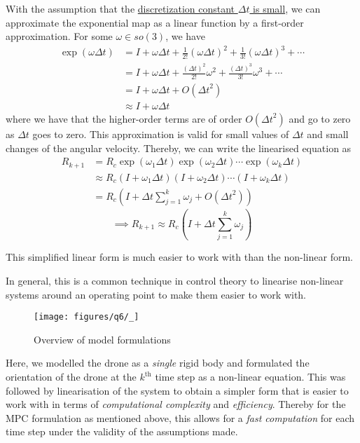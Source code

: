 With the assumption that the \underline{discretization constant \( \Delta t \) is small}, we can approximate the exponential map as a linear function by a first-order approximation.
For some \( \omega \in so(3)\), we have
\begin{align*}
    \exp(\omega \Delta t)
     & =
    I + \omega \Delta t + \frac{1}{2!} {(\omega \Delta t)}^2 + \frac{1}{3!} {(\omega \Delta t)}^3 + \cdots
    \\ & =
    I + \omega \Delta t + \frac{{(\Delta t)}^2}{2!} \omega^2 + \frac{{(\Delta t)}^3}{3!} \omega^3 + \cdots
    \\ & =
    I + \omega \Delta t + O({\Delta t}^2)
    \\
     & \approx
    I + \omega \Delta t
\end{align*}
where we have that the higher-order terms are of order \( O({\Delta t}^2) \) and go to zero as \( \Delta t \) goes to zero.
This approximation is valid for small values of \( \Delta t \) and small changes of the angular velocity.
Thereby, we can write the linearised equation as
\begin{align*}
    R_{k+1}
     & =
    R_c \exp(\omega_1 \Delta t) \exp(\omega_2 \Delta t) \cdots \exp(\omega_k \Delta t)
    \\ & \approx
    R_c (I + \omega_1 \Delta t) (I + \omega_2 \Delta t) \cdots (I + \omega_k \Delta t)
    \\ & =
    R_c \left( I + \Delta t \sum_{j=1}^{k} \omega_j + O({\Delta t}^2) \right)
\end{align*}
\begin{equation*}
    \implies
    \boxed{
        R_{k+1}
        \approx
        R_c \left( I + \Delta t \sum_{j=1}^{k} \omega_j \right)
    }
\end{equation*}

This simplified linear form is much easier to work with than the non-linear form.

In general, this is a common technique in control theory to linearise non-linear systems around an operating point to make them easier to work with.

\begin{figure}[htbp]
    \centering
    \texttt{[image: figures/q6/\_]}
    \caption{
        Overview of model formulations
    }\label{fig:q6-flowchart}
\end{figure}

Here, we modelled the drone as a \textit{single} rigid body and formulated the orientation of the drone at the \( k^{\text{th}} \) time step as a non-linear equation.
This was followed by linearisation of the system to obtain a simpler form that is easier to work with in terms of \textit{computational complexity} and \textit{efficiency}.
Thereby for the MPC formulation as mentioned above, this allows for a \textit{fast computation} for each time step under the validity of the assumptions made.

